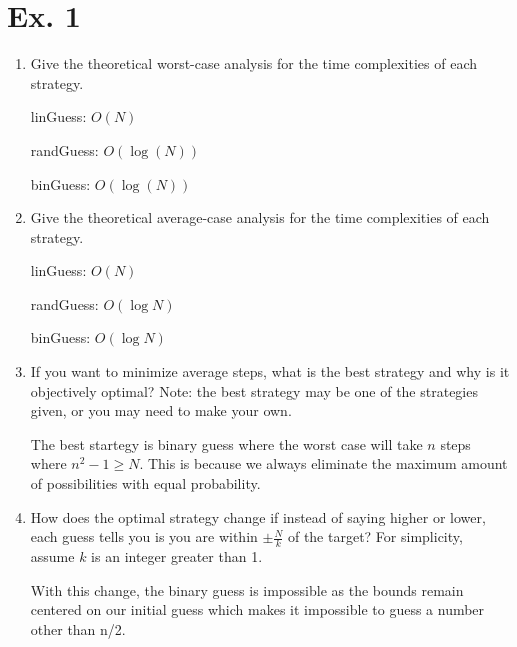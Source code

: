 \documentclass{article}
\begin{document}
\section{Ex. 1}
\begin{enumerate}
    \item Give the theoretical worst-case analysis for the time complexities of each strategy.
    
    linGuess: $O(N)$
    
    randGuess: $O(\log(N))$
    
    binGuess: $O(\log(N))$
    
    \item Give the theoretical average-case analysis for the time complexities of each strategy.
    
    linGuess: $O(N)$

    randGuess: $O(\log N)$

    binGuess: $O(\log N)$
    
    \item If you want to minimize average steps, what is the best strategy and why is it objectively optimal? Note: the best strategy may be one of the strategies given, or you may need to make your own.
    
    The best startegy is binary guess where the worst case will take $n$ steps where $n^2-1 \ge N$. This is because we always eliminate the maximum amount of possibilities with equal probability.

    \item How does the optimal strategy change if instead of saying higher or lower, each guess tells you is you are within $\pm \frac{N}{k}$ of the target? For simplicity, assume $k$ is an integer greater than 1.

    With this change, the binary guess is impossible as the bounds remain centered on our initial guess which makes it impossible to guess a number other than n/2.

\end{enumerate}
\end{document}
